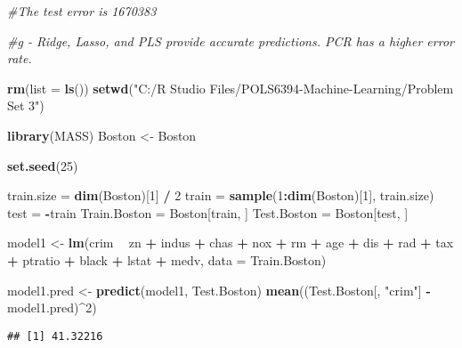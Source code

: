 \documentclass[
]{article}
\newenvironment{Shaded}{\begin{snugshade}}{\end{snugshade}}
\newcommand{\CommentTok}[1]{\textcolor[rgb]{0.56,0.35,0.01}{\textit{#1}}}
\newcommand{\DataTypeTok}[1]{\textcolor[rgb]{0.13,0.29,0.53}{#1}}
\newcommand{\DecValTok}[1]{\textcolor[rgb]{0.00,0.00,0.81}{#1}}
\newcommand{\KeywordTok}[1]{\textcolor[rgb]{0.13,0.29,0.53}{\textbf{#1}}}
\newcommand{\NormalTok}[1]{#1}
\newcommand{\OperatorTok}[1]{\textcolor[rgb]{0.81,0.36,0.00}{\textbf{#1}}}
\newcommand{\StringTok}[1]{\textcolor[rgb]{0.31,0.60,0.02}{#1}}
\begin{document}
\begin{Shaded}
\begin{Highlighting}[]
\CommentTok{#The test error is 1670383}

\CommentTok{#g - Ridge, Lasso, and PLS provide accurate predictions. PCR has a higher error rate. }

\KeywordTok{rm}\NormalTok{(}\DataTypeTok{list =} \KeywordTok{ls}\NormalTok{())}
\KeywordTok{setwd}\NormalTok{(}\StringTok{"C:/R Studio Files/POLS6394-Machine-Learning/Problem Set 3"}\NormalTok{)}

\KeywordTok{library}\NormalTok{(MASS)}
\NormalTok{Boston <-}\StringTok{ }\NormalTok{Boston}

\KeywordTok{set.seed}\NormalTok{(}\DecValTok{25}\NormalTok{)}

\NormalTok{train.size =}\StringTok{ }\KeywordTok{dim}\NormalTok{(Boston)[}\DecValTok{1}\NormalTok{] }\OperatorTok{/}\StringTok{ }\DecValTok{2}
\NormalTok{train =}\StringTok{ }\KeywordTok{sample}\NormalTok{(}\DecValTok{1}\OperatorTok{:}\KeywordTok{dim}\NormalTok{(Boston)[}\DecValTok{1}\NormalTok{], train.size)}
\NormalTok{test =}\StringTok{ }\OperatorTok{-}\NormalTok{train}
\NormalTok{Train.Boston =}\StringTok{ }\NormalTok{Boston[train, ]}
\NormalTok{Test.Boston =}\StringTok{ }\NormalTok{Boston[test, ]}

\NormalTok{model1 <-}\StringTok{ }\KeywordTok{lm}\NormalTok{(crim }\OperatorTok{~}\StringTok{ }\NormalTok{zn }\OperatorTok{+}\StringTok{ }\NormalTok{indus }\OperatorTok{+}\StringTok{ }\NormalTok{chas }\OperatorTok{+}\StringTok{ }\NormalTok{nox }\OperatorTok{+}\StringTok{ }\NormalTok{rm }\OperatorTok{+}\StringTok{ }\NormalTok{age }\OperatorTok{+}\StringTok{ }\NormalTok{dis }\OperatorTok{+}\StringTok{ }\NormalTok{rad }\OperatorTok{+}\StringTok{ }\NormalTok{tax }\OperatorTok{+}\StringTok{ }\NormalTok{ptratio }\OperatorTok{+}\StringTok{ }\NormalTok{black }\OperatorTok{+}\StringTok{ }\NormalTok{lstat }\OperatorTok{+}\StringTok{ }\NormalTok{medv,}
             \DataTypeTok{data =}\NormalTok{ Train.Boston)}


\NormalTok{model1.pred <-}\StringTok{ }\KeywordTok{predict}\NormalTok{(model1, Test.Boston)}
\KeywordTok{mean}\NormalTok{((Test.Boston[, }\StringTok{"crim"}\NormalTok{] }\OperatorTok{-}\StringTok{ }\NormalTok{model1.pred)}\OperatorTok{^}\DecValTok{2}\NormalTok{)}
\end{Highlighting}
\end{Shaded}

\begin{verbatim}
## [1] 41.32216
\end{verbatim}
\end{document}

